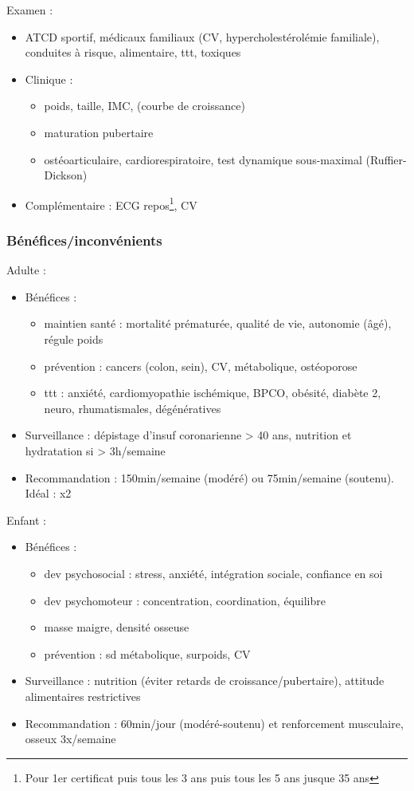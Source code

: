 \documentclass[11pt]{article}
\begin{document}
Examen :
\begin{itemize}
\item ATCD sportif, médicaux familiaux (CV, hypercholestérolémie familiale),
conduites à risque, alimentaire, ttt, toxiques
\item Clinique : 
\begin{itemize}
\item poids, taille, IMC, (courbe de croissance)
\item maturation pubertaire
\item ostéoarticulaire, cardiorespiratoire, test dynamique sous-maximal
(Ruffier-Dickson)
\end{itemize}
\item Complémentaire : ECG repos\footnote{Pour 1er certificat puis tous les 3 ans puis tous les 5
ans jusque 35 ans}, CV
\end{itemize}

\subsubsection{Bénéfices/inconvénients}
\label{sec:org87fb821}
Adulte :
\begin{itemize}
\item Bénéfices :
\begin{itemize}
\item maintien santé : \dec mortalité prématurée, \inc qualité de vie, \inc
autonomie (âgé), régule poids
\item prévention : cancers (colon, sein), CV, métabolique, ostéoporose \female
\item ttt : anxiété, cardiomyopathie ischémique, BPCO, obésité, diabète 2, neuro,
rhumatismales, dégénératives
\end{itemize}
\item Surveillance : dépistage d'insuf coronarienne > 40 ans, \danger nutrition et
hydratation si > 3h/semaine
\item Recommandation : 150min/semaine (modéré) ou 75min/semaine (soutenu). Idéal : x2
\end{itemize}

Enfant : 
\begin{itemize}
\item Bénéfices :
\begin{itemize}
\item dev psychosocial : \dec stress, anxiété, \inc intégration sociale, \inc
confiance en soi
\item dev psychomoteur : concentration, coordination, équilibre
\item \inc masse maigre, \inc densité osseuse
\item prévention : sd métabolique, surpoids, CV
\end{itemize}
\item Surveillance : nutrition (éviter retards de croissance/pubertaire), attitude
alimentaires restrictives
\item Recommandation : 60min/jour (modéré-soutenu) et renforcement musculaire,
osseux 3x/semaine
\end{itemize}
\end{document}
